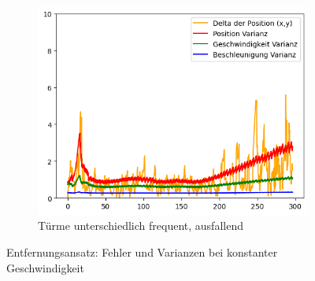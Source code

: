 \begin{figure}
\begin{subfigure}{.333\textwidth}
        \includegraphics[width=.9\linewidth]{Ergebnisse/plots_ungenauigkeiten/distanz/distanz_const_vel_flag_freq.png}
        \caption{Türme unterschiedlich frequent, ausfallend}
    \end{subfigure}
    \label{abb:distanz-cv-fehler}
    \caption{Entfernungsansatz: Fehler und Varianzen bei konstanter Geschwindigkeit}
\end{figure}